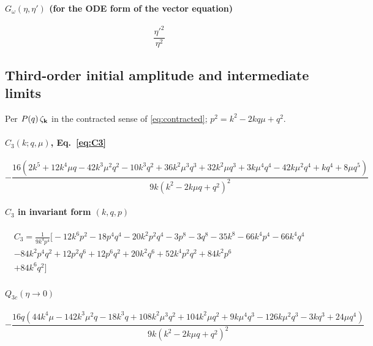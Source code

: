 \paragraph{$G_\omega(\eta,\eta')$ (for the ODE form of the vector equation)}
\begin{dmath}
\frac{{\eta'}^{2}}{\eta^{2}}
\end{dmath}


\subsection{Third-order initial amplitude and intermediate limits}
Per $P(q)\,\zeta_{\mathbf k}$ in the contracted sense of \eqref{eq:contracted}; $p^2=k^2-2kq\mu+q^2$.

\paragraph{$C_3(k;q,\mu)$, Eq.~\eqref{eq:C3}}
\begin{dmath}
- \frac{16 \left(2 k^{5} + 12 k^{4} \mu q - 42 k^{3} \mu^{2} q^{2} - 10 k^{3} q^{2} + 36 k^{2} \mu^{3} q^{3} + 32 k^{2} \mu q^{3} + 3 k \mu^{4} q^{4} - 42 k \mu^{2} q^{4} + k q^{4} + 8 \mu q^{5}\right)}{9 k \left(k^{2} - 2 k \mu q + q^{2}\right)^{2}}
\end{dmath}

\paragraph{$C_3$ in invariant form $(k,q,p)$}
\begin{multline*}
C_3=\frac{1}{9 k^{4} p^{4}}\Big[- 12 k^{6} p^{2}- 18 p^{4} q^{4}- 20 k^{2} p^{2} q^{4}- 3 p^{8}- 3 q^{8}- 35 k^{8}- 66 k^{4} p^{4}- 66 k^{4} q^{4}\\
- 84 k^{2} p^{4} q^{2}+12 p^{2} q^{6}+12 p^{6} q^{2}+20 k^{2} q^{6}+52 k^{4} p^{2} q^{2}+84 k^{2} p^{6}\\
+84 k^{6} q^{2}\Big]
\end{multline*}

\paragraph{$Q_{3c}(\eta\to0)$}
\begin{dmath}
- \frac{16 q \left(44 k^{4} \mu - 142 k^{3} \mu^{2} q - 18 k^{3} q + 108 k^{2} \mu^{3} q^{2} + 104 k^{2} \mu q^{2} + 9 k \mu^{4} q^{3} - 126 k \mu^{2} q^{3} - 3 k q^{3} + 24 \mu q^{4}\right)}{9 k \left(k^{2} - 2 k \mu q + q^{2}\right)^{2}}
\end{dmath}


